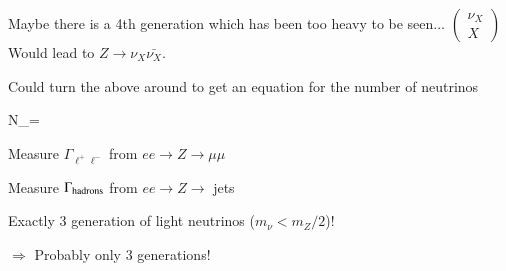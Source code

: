 {Maybe there is a 4th generation which has been too heavy to be seen... $\begin{pmatrix}\nu_X \\ X \end{pmatrix}$\\
Would lead to $Z\rightarrow \nu_X\bar{\nu_X}$.


Could turn the above around to get an equation for the number of neutrinos

\be
N_\nu = 
\ee

\bi
\item[-] Measure $\Gamma_{\ell^+\ell^-}$ from $ee\rightarrow Z \rightarrow \mu\mu$
\item[-] Measure $\Gamma_{\textrm{hadrons}}$ from $ee\rightarrow Z \rightarrow $ jets
 \ei

\bc
{}
\ec

Exactly 3 generation of light neutrinos ($m_\nu < m_Z/2$)! 

$\Rightarrow$ Probably only 3 generations!

}



